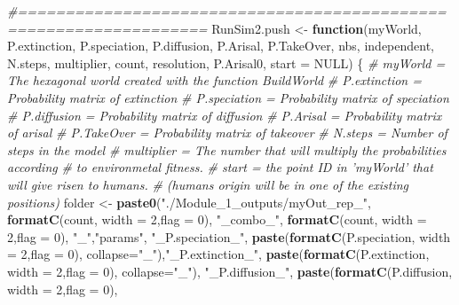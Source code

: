 \documentclass[]{book}
\newenvironment{Shaded}{\begin{snugshade}}{\end{snugshade}}
\newcommand{\KeywordTok}[1]{\textcolor[rgb]{0.13,0.29,0.53}{\textbf{{#1}}}}
\newcommand{\DataTypeTok}[1]{\textcolor[rgb]{0.13,0.29,0.53}{{#1}}}
\newcommand{\DecValTok}[1]{\textcolor[rgb]{0.00,0.00,0.81}{{#1}}}
\newcommand{\StringTok}[1]{\textcolor[rgb]{0.31,0.60,0.02}{{#1}}}
\newcommand{\CommentTok}[1]{\textcolor[rgb]{0.56,0.35,0.01}{\textit{{#1}}}}
\newcommand{\OtherTok}[1]{\textcolor[rgb]{0.56,0.35,0.01}{{#1}}}
\newcommand{\ControlFlowTok}[1]{\textcolor[rgb]{0.13,0.29,0.53}{\textbf{{#1}}}}
\newcommand{\NormalTok}[1]{{#1}}
\theoremstyle{definition}
\theoremstyle{definition}
\theoremstyle{remark}
\begin{document}
\begin{Shaded}
\begin{Highlighting}[]
\CommentTok{#==================================================================}
\NormalTok{RunSim2.push <-}\StringTok{ }\ControlFlowTok{function}\NormalTok{(myWorld, P.extinction, P.speciation,}
\NormalTok{                    P.diffusion, P.Arisal, P.TakeOver, nbs, independent,}
\NormalTok{                    N.steps, multiplier, count, resolution, P.Arisal0,}
                    \DataTypeTok{start =} \OtherTok{NULL}\NormalTok{) \{}
  \CommentTok{# myWorld = The hexagonal world created with the function BuildWorld}
  \CommentTok{# P.extinction = Probability matrix of extinction}
  \CommentTok{# P.speciation = Probability matrix of speciation}
  \CommentTok{# P.diffusion = Probability matrix of diffusion}
  \CommentTok{# P.Arisal = Probability matrix of arisal}
  \CommentTok{# P.TakeOver = Probability matrix of takeover}
  \CommentTok{# N.steps = Number of steps in the model}
  \CommentTok{# multiplier = The number that will multiply the probabilities according}
  \CommentTok{# to environmetal fitness.}
  \CommentTok{# start = the point ID in 'myWorld' that will give risen to humans.}
  \CommentTok{# (humans origin will be in one of the existing positions)}
\NormalTok{  folder <-}\StringTok{ }\KeywordTok{paste0}\NormalTok{(}\StringTok{"./Module_1_outputs/myOut_rep_"}\NormalTok{,}
                   \KeywordTok{formatC}\NormalTok{(count, }\DataTypeTok{width =} \DecValTok{2}\NormalTok{,}\DataTypeTok{flag =} \DecValTok{0}\NormalTok{),}
                   \StringTok{"_combo_"}\NormalTok{,}
                   \KeywordTok{formatC}\NormalTok{(count, }\DataTypeTok{width =} \DecValTok{2}\NormalTok{,}\DataTypeTok{flag =} \DecValTok{0}\NormalTok{),}
                   \StringTok{"_"}\NormalTok{,}\StringTok{"params"}\NormalTok{, }\StringTok{"_P.speciation_"}\NormalTok{,}
                   \KeywordTok{paste}\NormalTok{(}\KeywordTok{formatC}\NormalTok{(P.speciation, }\DataTypeTok{width =} \DecValTok{2}\NormalTok{,}\DataTypeTok{flag =} \DecValTok{0}\NormalTok{),}
                         \DataTypeTok{collapse=}\StringTok{"_"}\NormalTok{),}\StringTok{"_P.extinction_"}\NormalTok{,}
                   \KeywordTok{paste}\NormalTok{(}\KeywordTok{formatC}\NormalTok{(P.extinction, }\DataTypeTok{width =} \DecValTok{2}\NormalTok{,}\DataTypeTok{flag =} \DecValTok{0}\NormalTok{),}
                         \DataTypeTok{collapse=}\StringTok{"_"}\NormalTok{), }\StringTok{"_P.diffusion_"}\NormalTok{,}
                   \KeywordTok{paste}\NormalTok{(}\KeywordTok{formatC}\NormalTok{(P.diffusion, }\DataTypeTok{width =} \DecValTok{2}\NormalTok{,}\DataTypeTok{flag =} \DecValTok{0}\NormalTok{),}

\end{Highlighting}
\end{Shaded}
\end{document}
